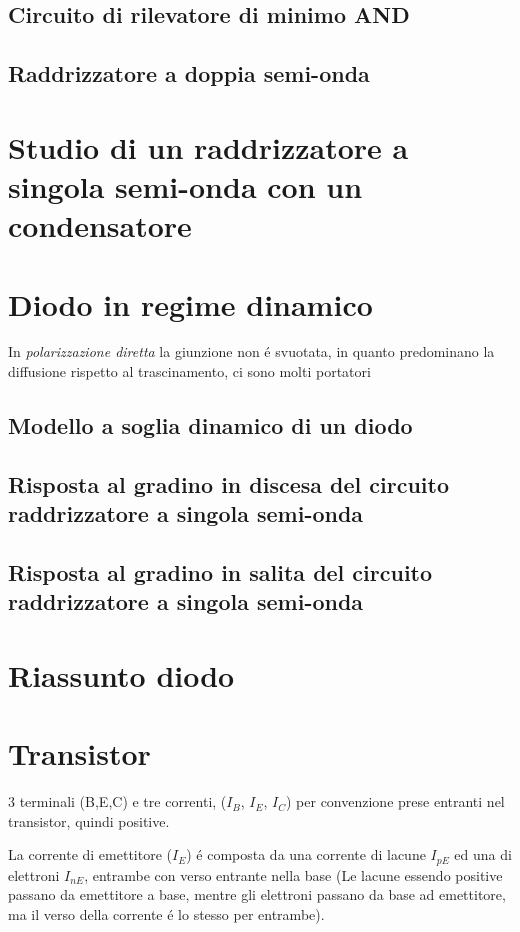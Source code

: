 \documentclass{article}
\begin{document}
\subsection{Circuito di rilevatore di minimo AND}
\subsection{Raddrizzatore a doppia semi-onda}
\section{Studio di un raddrizzatore a singola semi-onda con un condensatore}
\section{Diodo in regime dinamico}
In \textit{polarizzazione diretta} la giunzione non \'e svuotata, in quanto predominano la diffusione rispetto al trascinamento, ci sono molti portatori

\subsection{Modello a soglia dinamico di un diodo}
\subsection{Risposta al gradino in discesa del circuito raddrizzatore a singola semi-onda}
\subsection{Risposta al gradino in salita del circuito raddrizzatore a singola semi-onda}
\section{Riassunto diodo}

\section{Transistor}
3 terminali (B,E,C) e tre correnti, ($I_B$, $I_E$, $I_C$) per convenzione prese entranti nel transistor, quindi positive.

La corrente di emettitore ($I_E$) \'e composta da una corrente di lacune $I_{pE}$ ed una di elettroni $I_{nE}$, entrambe con verso entrante nella base (Le lacune essendo positive passano da emettitore a base, mentre gli elettroni passano da base ad emettitore, ma il verso della corrente \'e lo stesso per entrambe).
\end{document}

